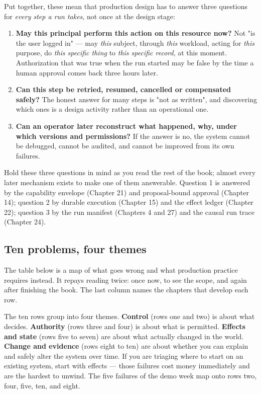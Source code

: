 Put together, these mean that production design has to answer three questions for \emph{every step a run takes}, not once at the design stage:\par

\begin{enumerate}

\item \textbf{May this principal perform this action on this resource now?} Not "is the user logged in" — may \emph{this} subject, through \emph{this} workload, acting for \emph{this} purpose, do \emph{this specific thing} to \emph{this specific record}, at this moment. Authorization that was true when the run started may be false by the time a human approval comes back three hours later.

\item \textbf{Can this step be retried, resumed, cancelled or compensated safely?} The honest answer for many steps is "not as written", and discovering which ones is a design activity rather than an operational one.

\item \textbf{Can an operator later reconstruct what happened, why, under which versions and permissions?} If the answer is no, the system cannot be debugged, cannot be audited, and cannot be improved from its own failures.

\end{enumerate}

Hold these three questions in mind as you read the rest of the book; almost every later mechanism exists to make one of them answerable. Question 1 is answered by the capability envelope (Chapter 21) and proposal-bound approval (Chapter 14); question 2 by durable execution (Chapter 15) and the effect ledger (Chapter 22); question 3 by the run manifest (Chapters 4 and 27) and the causal run trace (Chapter 24).\par

\subsection{Ten problems, four themes}

The table below is a map of what goes wrong and what production practice requires instead. It repays reading twice: once now, to see the scope, and again after finishing the book. The last column names the chapters that develop each row.\par

The ten rows group into four themes. \textbf{Control} (rows one and two) is about what decides. \textbf{Authority} (rows three and four) is about what is permitted. \textbf{Effects and state} (rows five to seven) are about what actually changed in the world. \textbf{Change and evidence} (rows eight to ten) are about whether you can explain and safely alter the system over time. If you are triaging where to start on an existing system, start with effects — those failures cost money immediately and are the hardest to unwind. The five failures of the demo week map onto rows two, four, five, ten, and eight.\par

